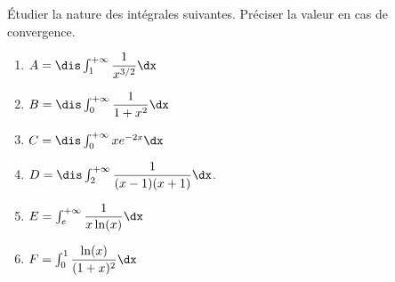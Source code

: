 \documentclass[a4paper,10pt]{report}
\begin{document}
\everymath{\displaystyle}


\begin{center}
\end{center}

\bigskip

\begin{Exercice}{} Étudier la nature des intégrales suivantes. Préciser la valeur en cas de convergence.

\begin{multicols}{2}
\begin{enumerate}
\item $A = \dis \int_1^{+ \infty} \dfrac{1}{x^{3/2}} \dx$
\item $B = \dis \int_0^{+ \infty} \dfrac{1}{1+x^2} \dx$
\item $C = \dis \int_0^{+ \infty} x e^{-2x} \dx$
\item $D= \dis \int_2^{+ \infty} \dfrac{1}{(x-1)(x+1)} \dx$.
\item $E= \int_{e}^{+ \infty} \dfrac{1}{x\ln(x)} \dx$
\item $F= \int_0^1 \dfrac{\ln(x)}{(1+x)^2} \dx$
\end{enumerate}
\end{multicols}
\vspace{0.1cm}
\end{Exercice}

\corr 
\end{document}
